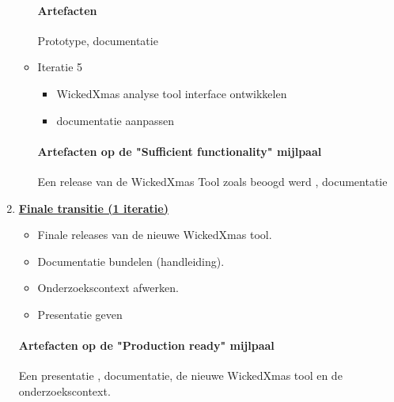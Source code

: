 \begin{enumerate}
\begin{itemize}
		\paragraph{Artefacten}
		Prototype, documentatie
	\item Iteratie 5
		\begin{itemize}
		\item WickedXmas analyse tool interface ontwikkelen
		\item documentatie aanpassen
		\end{itemize}
		\paragraph{Artefacten op de "Sufficient functionality" mijlpaal }
		 Een release van de WickedXmas Tool zoals beoogd werd , documentatie
	\end{itemize}
		
\item \underline{\textbf{Finale transitie (1 iteratie)}}
	\begin{itemize}
		\item Finale releases van de nieuwe WickedXmas tool.
		\item Documentatie bundelen (handleiding).
		\item Onderzoekscontext afwerken.
		\item Presentatie geven
	\end{itemize}
	\paragraph{Artefacten op de "Production ready" mijlpaal}
	Een presentatie , documentatie, de nieuwe WickedXmas tool en de onderzoekscontext.

\end{enumerate}